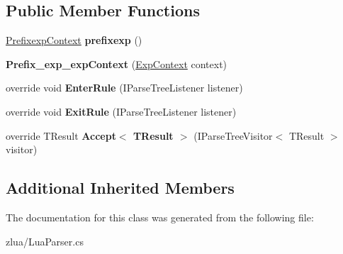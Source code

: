 \subsection*{Public Member Functions}
\begin{DoxyCompactItemize}
\item 
\mbox{\label{classzlua_1_1_lua_parser_1_1_prefix__exp__exp_context_acf3767924c60eaa26c66457bcce3c892}} 
\mbox{\hyperlink{classzlua_1_1_lua_parser_1_1_prefixexp_context}{Prefixexp\+Context}} {\bfseries prefixexp} ()
\item 
\mbox{\label{classzlua_1_1_lua_parser_1_1_prefix__exp__exp_context_a17a20fbb3707a6566da358ce2f91ebfd}} 
{\bfseries Prefix\+\_\+exp\+\_\+exp\+Context} (\mbox{\hyperlink{classzlua_1_1_lua_parser_1_1_exp_context}{Exp\+Context}} context)
\item 
\mbox{\label{classzlua_1_1_lua_parser_1_1_prefix__exp__exp_context_afda504b77fe4576d63f8fc74b4838ce7}} 
override void {\bfseries Enter\+Rule} (I\+Parse\+Tree\+Listener listener)
\item 
\mbox{\label{classzlua_1_1_lua_parser_1_1_prefix__exp__exp_context_a8e3c91e1b50c9456a860dd9e4c8613d8}} 
override void {\bfseries Exit\+Rule} (I\+Parse\+Tree\+Listener listener)
\item 
\mbox{\label{classzlua_1_1_lua_parser_1_1_prefix__exp__exp_context_afe378ff96efee07152f35ae4307b7f33}} 
override T\+Result {\bfseries Accept$<$ T\+Result $>$} (I\+Parse\+Tree\+Visitor$<$ T\+Result $>$ visitor)
\end{DoxyCompactItemize}
\subsection*{Additional Inherited Members}


The documentation for this class was generated from the following file\+:\begin{DoxyCompactItemize}
\item 
zlua/Lua\+Parser.\+cs\end{DoxyCompactItemize}
